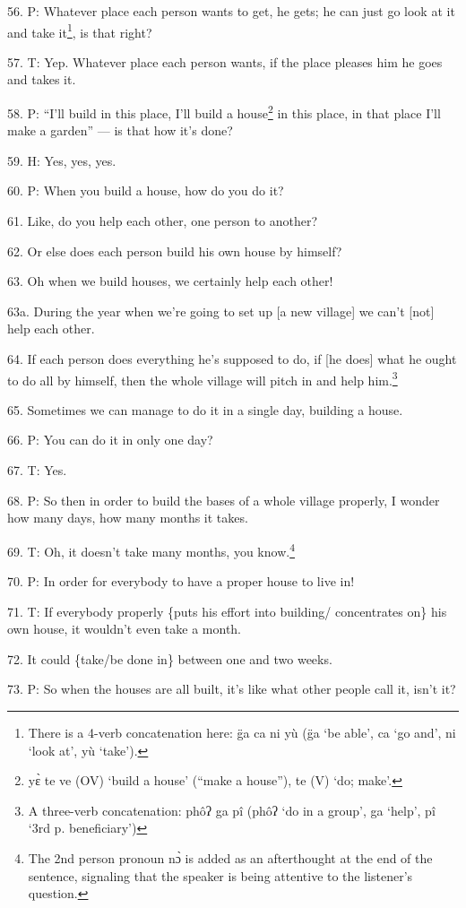 56. P: Whatever place each person wants to get, he gets; he can just go look at
it and take it\footnote{There is a 4-verb concatenation here: g̈a ca ni yù (g̈a `be able', ca `go and', ni `look at', yù `take').}, is that right?

57. T: Yep. Whatever place each person wants, if the place pleases him he goes
and takes it.

58. P: ``I'll build in this place, I'll build a house\footnote{yɛ̀ te ve (OV) `build a house' (``make a house''), te (V) `do; make'.} in this place, in that
place I'll make a garden'' --- is that how it's done?

59. H: Yes, yes, yes.

60. P: When you build a house, how do you do it?

61. Like, do you help each other, one person to another?

62. Or else does each person build his own house by himself?

63. Oh when we build houses, we certainly help each other!

63a. During the year when we're going to set up [a new village] we can't [not]
help each other.

64. If each person does everything he's supposed to do, if [he does] what he ought
to do all by himself, then the whole village will pitch in and help him.\footnote{A three-verb concatenation: phôʔ ga pî (phôʔ `do in a group', ga `help', pî `3rd p. beneficiary')}

65. Sometimes we can manage to do it in a single day, building a house.

66. P: You can do it in only one day?

67. T: Yes.

68. P: So then in order to build the bases of a whole village properly, I wonder
how many days, how many months it takes.

69. T: Oh, it doesn't take many months, you know.\footnote{The 2nd person pronoun nɔ̀ is added as an afterthought at the end of the sentence, signaling that the speaker is being attentive to the listener's question.}

70. P: In order for everybody to have a proper house to live in!

71. T: If everybody properly \{puts his effort into building/ concentrates on\}
his own house, it wouldn't even take a month.

72. It could \{take/be done in\} between one and two weeks.

73. P: So when the houses are all built, it's like what other people call it, isn't
it?

